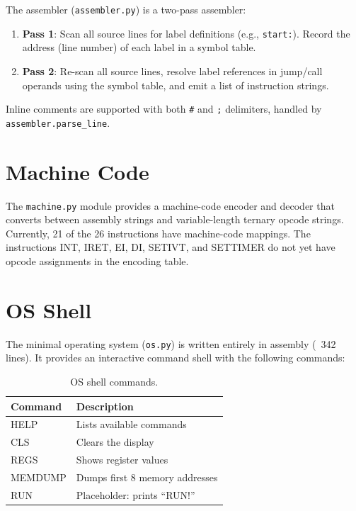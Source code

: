 \documentclass[11pt,a4paper]{article}
\begin{document}
The assembler (\texttt{assembler.py}) is a two-pass assembler:

\begin{enumerate}
  \item \textbf{Pass 1}: Scan all source lines for label definitions
        (e.g., \texttt{start:}).  Record the address (line number) of each
        label in a symbol table.
  \item \textbf{Pass 2}: Re-scan all source lines, resolve label references
        in jump/call operands using the symbol table, and emit a list of
        instruction strings.
\end{enumerate}

Inline comments are supported with both \texttt{\#} and \texttt{;} delimiters,
handled by \texttt{assembler.parse\_line}.

\section{Machine Code}
\label{sec:machine-code}

The \texttt{machine.py} module provides a machine-code encoder and decoder that
converts between assembly strings and variable-length ternary opcode strings.
Currently, 21 of the 26 instructions have machine-code mappings.  The
instructions INT, IRET, EI, DI, SETIVT, and SETTIMER do not yet have opcode
assignments in the encoding table.

\section{OS Shell}
\label{sec:os}

The minimal operating system (\texttt{os.py}) is written entirely in assembly
(~342 lines).  It provides an interactive command shell with the following
commands:

\begin{table}[H]
  \centering
  \caption{OS shell commands.}
  \label{tab:os-commands}
  \begin{tabular}{l|l}
    \textbf{Command} & \textbf{Description} \\ \hline
    HELP     & Lists available commands \\
    CLS      & Clears the display \\
    REGS     & Shows register values \\
    MEMDUMP  & Dumps first 8 memory addresses \\
    RUN      & Placeholder: prints ``RUN!''
  \end{tabular}
\end{table}
\end{document}
